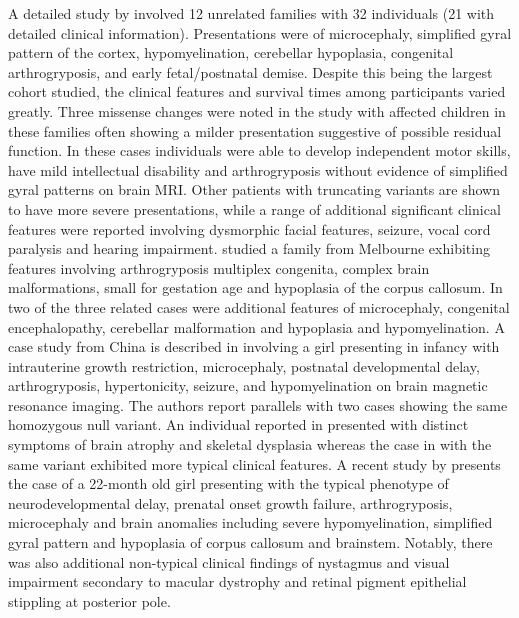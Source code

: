 \documentclass[
  authoryear,
  preprint,
  3p]{elsarticle}
\begin{document}
A detailed study by \citet{magini2019loss} involved 12 unrelated
families with 32 individuals (21 with detailed clinical information).
Presentations were of microcephaly, simplified gyral pattern of the
cortex, hypomyelination, cerebellar hypoplasia, congenital
arthrogryposis, and early fetal/postnatal demise. Despite this being the
largest cohort studied, the clinical features and survival times among
participants varied greatly. Three missense changes were noted in the
study with affected children in these families often showing a milder
presentation suggestive of possible residual function. In these cases
individuals were able to develop independent motor skills, have mild
intellectual disability and arthrogryposis without evidence of
simplified gyral patterns on brain MRI. Other patients with truncating
variants are shown to have more severe presentations, while a range of
additional significant clinical features were reported involving
dysmorphic facial features, seizure, vocal cord paralysis and hearing
impairment. \citet{ravenscroft2021neurogenetic} studied a family from
Melbourne exhibiting features involving arthrogryposis multiplex
congenita, complex brain malformations, small for gestation age and
hypoplasia of the corpus callosum. In two of the three related cases
were additional features of microcephaly, congenital encephalopathy,
cerebellar malformation and hypoplasia and hypomyelination. A case study
from China is described in \citet{ji2022case} involving a girl
presenting in infancy with intrauterine growth restriction,
microcephaly, postnatal developmental delay, arthrogryposis,
hypertonicity, seizure, and hypomyelination on brain magnetic resonance
imaging. The authors report parallels with two cases showing the same
homozygous null variant. An individual reported in
\citet{monies2019lessons} presented with distinct symptoms of brain
atrophy and skeletal dysplasia whereas the case in
\citet{magini2019loss} with the same variant exhibited more typical
clinical features. A recent study by \citet{bijarnia2022growth} presents
the case of a 22-month old girl presenting with the typical phenotype of
neurodevelopmental delay, prenatal onset growth failure, arthrogryposis,
microcephaly and brain anomalies including severe hypomyelination,
simplified gyral pattern and hypoplasia of corpus callosum and
brainstem. Notably, there was also additional non-typical clinical
findings of nystagmus and visual impairment secondary to macular
dystrophy and retinal pigment epithelial stippling at posterior pole.
\end{document}
